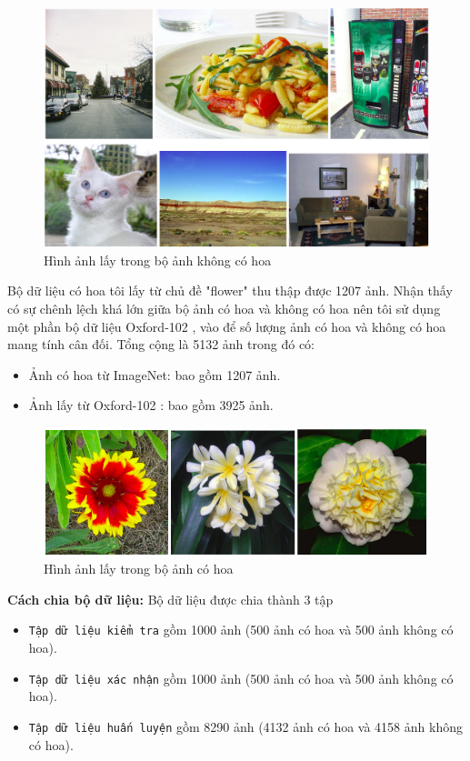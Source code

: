 \documentclass[12pt]{report}
\begin{document}
								
		\begin{figure}[h]
			\centering
			\includegraphics[scale=0.4]{nonflower}
			\caption{Hình ảnh lấy trong bộ ảnh không có hoa}
			\label{fig:nonflower}
		\end{figure}
								
		Bộ dữ liệu có hoa tôi lấy từ chủ đề "flower" thu thập được 1207 ảnh. Nhận thấy có sự chênh lệch khá lớn giữa bộ ảnh có hoa và không có hoa nên tôi sử dụng một phần bộ dữ liệu Oxford-102 \cite{cia-Nilsback06}, vào để số lượng ảnh có hoa và không có hoa mang tính cân đối. Tổng cộng là 5132 ảnh trong đó có:
		\begin{itemize}
			\item Ảnh có hoa từ ImageNet: bao gồm 1207 ảnh.
			\item Ảnh lấy từ Oxford-102	: bao gồm 3925 ảnh.
		\end{itemize}
								
		\begin{figure}[h]
			\centering
			\includegraphics[scale=0.6]{anhcohoa}
			\caption{Hình ảnh lấy trong bộ ảnh có hoa}
			\label{fig:anhcohoa}
		\end{figure}
								
		\textbf{Cách chia bộ dữ liệu:} Bộ dữ liệu được chia thành 3 tập
		\begin{itemize}
			\item \texttt{Tập dữ liệu kiểm tra} gồm 1000 ảnh (500 ảnh có hoa và 500 ảnh không có hoa).
			\item \texttt{Tập dữ liệu xác nhận} gồm 1000 ảnh (500 ảnh có hoa và 500 ảnh không có hoa).
			\item \texttt{Tập dữ liệu huấn luyện} gồm 8290 ảnh (4132 ảnh có hoa và 4158 ảnh không có hoa).
		\end{itemize}
								
\end{document}

